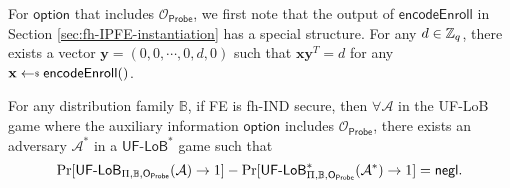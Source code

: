 For $\textsf{option}$ that includes $\mathcal{O}_{\textsf{Probe}}$, we first note that the output of $\textsf{encodeEnroll}$ in Section \ref{sec:fh-IPFE-instantiation} has a special structure. For any $d \in \mathbb{Z}_q$, there exists a vector $\mathbf{y} = (0, 0, \cdots, 0, d, 0)$ such that $\mathbf{x}\mathbf{y}^T = d$ for any $\mathbf{x} \getsdollar \textsf{encodeEnroll}()$.


\begin{theorem}
\label{thm:ind-uf-lob3}

For any distribution family $\mathbb{B}$, if \textsf{FE} is fh-IND secure, then $\forall \mathcal{A}$ in the \textsf{UF-LoB} game where the auxiliary information $\textsf{option}$ includes $\mathcal{O}_\textsf{Probe}$, there exists an adversary $\mathcal{A}^*$ in a $\textsf{UF-LoB}^*$ game such that
\[
	\Pr[\textsf{UF-LoB}_{\Pi, \mathbb{B}, \textsf{O}_{\textsf{Probe}}}(\mathcal{A}) \to 1] - \Pr[\textsf{UF-LoB}^*_{\Pi, \mathbb{B}, \textsf{O}_{\textsf{Probe}} }(\mathcal{A}^* ) \to 1] = \mathsf{negl}.
\]	

\end{theorem}


